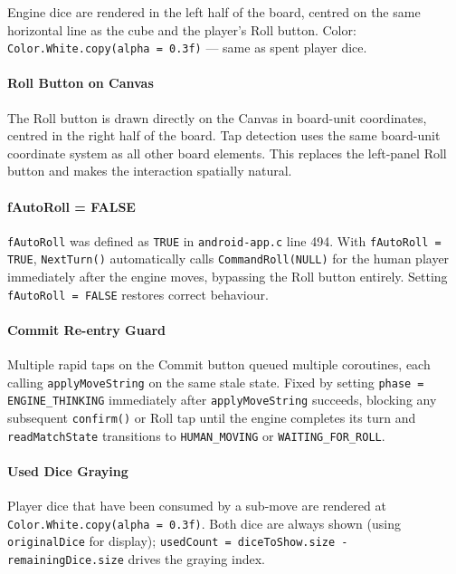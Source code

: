 \documentclass[11pt,a4paper]{article}
\begin{document}
Engine dice are rendered in the left half of the board, centred on the
same horizontal line as the cube and the player's Roll button. Color:
\texttt{Color.White.copy(alpha = 0.3f)} — same as spent player dice.

\paragraph{Roll Button on Canvas}

The Roll button is drawn directly on the Canvas in board-unit coordinates,
centred in the right half of the board. Tap detection uses the same
board-unit coordinate system as all other board elements. This replaces
the left-panel Roll button and makes the interaction spatially natural.

\paragraph{fAutoRoll = FALSE}

\texttt{fAutoRoll} was defined as \texttt{TRUE} in \texttt{android-app.c}
line 494. With \texttt{fAutoRoll = TRUE}, \texttt{NextTurn()} automatically
calls \texttt{CommandRoll(NULL)} for the human player immediately after the
engine moves, bypassing the Roll button entirely. Setting
\texttt{fAutoRoll = FALSE} restores correct behaviour.

\paragraph{Commit Re-entry Guard}

Multiple rapid taps on the Commit button queued multiple coroutines, each
calling \texttt{applyMoveString} on the same stale state. Fixed by
setting \texttt{phase = ENGINE\_THINKING} immediately after
\texttt{applyMoveString} succeeds, blocking any subsequent \texttt{confirm()}
or Roll tap until the engine completes its turn and \texttt{readMatchState}
transitions to \texttt{HUMAN\_MOVING} or \texttt{WAITING\_FOR\_ROLL}.

\paragraph{Used Dice Graying}

Player dice that have been consumed by a sub-move are rendered at
\texttt{Color.White.copy(alpha = 0.3f)}. Both dice are always shown
(using \texttt{originalDice} for display); \texttt{usedCount =
diceToShow.size - remainingDice.size} drives the graying index.
\end{document}
